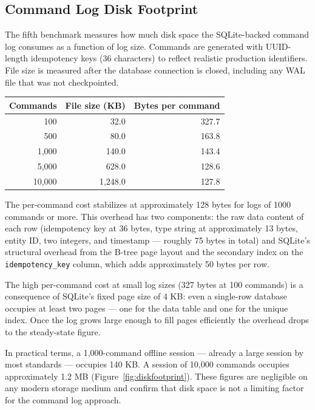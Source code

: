 \documentclass{article}
\begin{document}
\subsection{Command Log Disk Footprint}

The fifth benchmark measures how much disk space the SQLite-backed command log consumes as a function of log size. Commands are generated with UUID-length idempotency keys (36 characters) to reflect realistic production identifiers. File size is measured after the database connection is closed, including any WAL file that was not checkpointed.

\begin{center}
\begin{tabular}{rrr}
\hline
Commands & File size (KB) & Bytes per command \\
\hline
100      & 32.0           & 327.7 \\
500      & 80.0           & 163.8 \\
1,000    & 140.0          & 143.4 \\
5,000    & 628.0          & 128.6 \\
10,000   & 1,248.0        & 127.8 \\
\hline
\end{tabular}
\end{center}

The per-command cost stabilizes at approximately 128 bytes for logs of 1000 commands or more. This overhead has two components: the raw data content of each row (idempotency key at 36 bytes, type string at approximately 13 bytes, entity ID, two integers, and timestamp — roughly 75 bytes in total) and SQLite's structural overhead from the B-tree page layout and the secondary index on the \texttt{idempotency\_key} column, which adds approximately 50 bytes per row.

The high per-command cost at small log sizes (327 bytes at 100 commands) is a consequence of SQLite's fixed page size of 4 KB: even a single-row database occupies at least two pages — one for the data table and one for the unique index. Once the log grows large enough to fill pages efficiently the overhead drops to the steady-state figure.

In practical terms, a 1,000-command offline session — already a large session by most standards — occupies 140 KB. A session of 10,000 commands occupies approximately 1.2 MB (Figure~\ref{fig:diskfootprint}). These figures are negligible on any modern storage medium and confirm that disk space is not a limiting factor for the command log approach.
\end{document}
